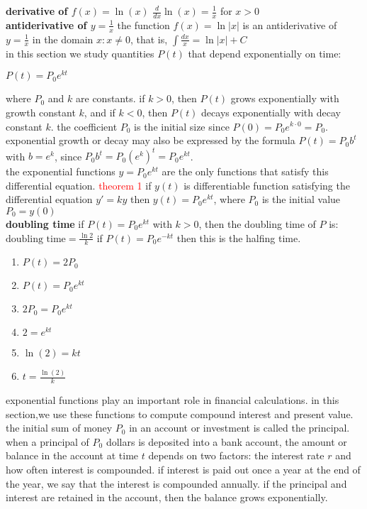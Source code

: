 \documentclass{article}
\begin{document}
\textbf{derivative of $f(x) = \ln(x)$} $\frac{d}{dx}\ln(x) = \frac{1}{x}$ for $x > 0$\\

\textbf{antiderivative of $y = \frac{1}{x}$} the function $f(x) = \ln \lvert x\rvert$ is an antiderivative of $y = \frac{1}{x}$ in the domain ${x : x \neq 0}$, that is, $\int\frac{dx}{x} = \ln \lvert x \rvert + C$\\

in this section we study quantities $P(t)$ that depend exponentially on time:

\begin{center}$P(t) = P_0e^{kt}$\end{center}

where $P_0$ and $k$ are constants. if $k > 0$, then $P(t)$ grows exponentially with growth constant $k$, and if $k < 0$, then $P(t)$ decays exponentially with decay constant $k$. the coefficient $P_0$ is the initial size since $P(0) = P_0e^{k \cdot 0} = P_0$. exponential growth or decay may also be expressed by the formula $P(t) = P_0b^t$ with $b = e^k$, since $P_0b^t = P_0(e^k)^t = P_0e^{kt}$.\\

the exponential functions $y = P_0e^{kt}$ are the only functions that satisfy this differential equation. \textcolor{red}{theorem 1} if $y(t)$ is differentiable function satisfying the differential equation $y' = ky$ then $y(t) = P_0e^{kt}$, where $P_0$ is the initial value $P_0 = y(0)$\\

\textbf{doubling time} if $P(t) = P_0e^{kt}$ with $k > 0$, then the doubling time of $P$ is:\\
$\text{doubling time} = \frac{\ln2}{k}$ if $P(t) = P_0e^{-kt}$ then this is the halfing time.\\

	\begin{enumerate}
		\item $P(t) = 2P_0$
		\item $P(t) = P_0e^{kt}$
		\item $2P_0 = P_0e^{kt}$
		\item $2 = e^{kt}$
		\item $\ln(2) = kt$
		\item $t = \frac{\ln(2)}{k}$
	\end{enumerate}

exponential functions play an important role in financial calculations. in this section,we use these functions to compute compound interest and present value. the initial sum of money $P_0$ in an account or investment is called the principal. when a principal of $P_0$ dollars is deposited into a bank account, the amount or balance in the account at time $t$ depends on two factors: the interest rate $r$ and how often interest is compounded. if interest is paid out once a year at the end of the year, we say that the interest is compounded annually. if the principal and interest are retained in the account, then the balance grows exponentially.\\
\end{document}
